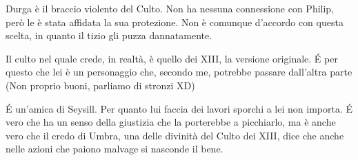 \documentclass[9pt,a4paper,cleardoubleempty]{scrbook}
\begin{document}
          Durga è il braccio violento del Culto. Non ha nessuna
          connessione con Philip, però le è stata affidata la sua
          protezione. Non è comunque d'accordo con questa scelta, in quanto
          il tizio gli puzza dannatamente.

          Il culto nel quale crede, in realtà, è quello dei XIII, la
          versione originale. \'E per questo che lei è un personaggio che,
          secondo me, potrebbe passare dall'altra parte (Non proprio buoni,
          parliamo di stronzi XD)

          \'E un'amica di Seysill. Per quanto lui faccia dei lavori sporchi
          a lei non importa. \'E vero che ha un senso della giustizia che
          la porterebbe a picchiarlo, ma è anche vero che il credo di
          Umbra, una delle divinità del Culto dei XIII, dice che anche
          nelle azioni che paiono malvage si nasconde il bene.
\end{document}

